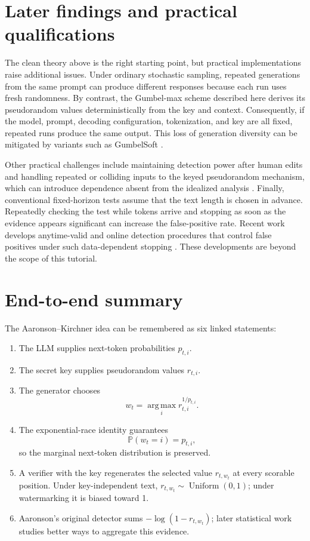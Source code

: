 \documentclass[11pt]{article}
\DeclareRobustCommand{\iperpaper}[2]{%
  \begingroup
  \hypersetup{pdfborder=0 0 0}%
  \href{iperpaper:#1}{{\color{iperpaperlink}#2}}%
  \endgroup
}
\def\iperpaper#1#2{#2}%
\newcommand{\U}{\operatorname{Uniform}}
\newcommand{\Pp}{\mathbb{P}}
\newcommand{\argmax}{\operatorname*{arg\,max}}
\begin{document}
\section{Later findings and practical qualifications}

The clean theory above is the right starting point, but practical implementations
raise additional issues. Under ordinary stochastic sampling, repeated generations
from the same prompt can produce different responses because each run uses fresh
randomness. By contrast, the Gumbel-max scheme described here derives its
pseudorandom values deterministically from the key and context. Consequently, if
the model, prompt, decoding configuration, tokenization, and key are all fixed,
repeated runs produce the same output. This loss of generation diversity can be
mitigated by variants such as GumbelSoft \cite{fu2024}.

Other practical challenges include maintaining detection power after human edits
\cite{liedits2025} and handling repeated or colliding inputs to the keyed
pseudorandom mechanism, which can introduce dependence absent from the idealized
analysis \cite{khachaturov2025,cai2025collision}. Finally, conventional
fixed-horizon tests assume that the text length is chosen in advance. Repeatedly
checking the test while tokens arrive and stopping as soon as the evidence appears
significant can increase the false-positive rate. Recent work develops
anytime-valid and online detection procedures that control false positives under such
data-dependent stopping \cite{huang2026,luo2026}. These developments are beyond
the scope of this tutorial.


\section{End-to-end summary}

The Aaronson--Kirchner idea can be remembered as six linked statements:
\begin{enumerate}
\item The LLM supplies next-token probabilities $p_{t,i}$.
\item The secret key supplies pseudorandom values $r_{t,i}$.
\item The generator chooses
\[
  w_t=\iperpaper{argmax_symbol}{\argmax}_i r_{t,i}^{1/p_{t,i}}.
\]
\item The exponential-race identity guarantees
\[
  \Pp(w_t=i)=p_{t,i},
\]
so the marginal next-token distribution is preserved.
\item A verifier with the key regenerates the selected value $r_{t,w_t}$ at every scorable position. Under key-independent text, $r_{t,w_t}\sim\iperpaper{uniform_symbol}{\U}(0,1)$; under watermarking it is biased toward 1.
\item Aaronson's original detector sums $-\log(1-r_{t,w_t})$; later statistical work studies better ways to aggregate this evidence.
\end{enumerate}
\end{document}

